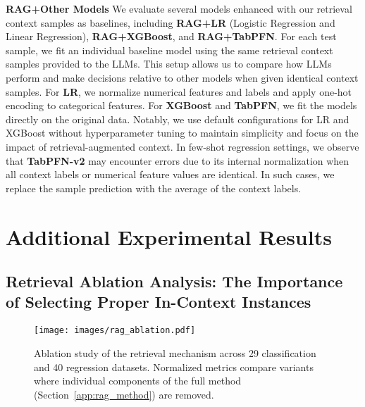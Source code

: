 \textbf{RAG+Other Models}
We evaluate several models enhanced with our retrieval context samples as baselines, including \textbf{RAG+LR} (Logistic Regression and Linear Regression), \textbf{RAG+XGBoost}, and \textbf{RAG+TabPFN}. For each test sample, we fit an individual baseline model using the same retrieval context samples provided to the LLMs. This setup allows us to compare how LLMs perform and make decisions relative to other models when given identical context samples. For \textbf{LR}, we normalize numerical features and labels and apply one-hot encoding to categorical features. For \textbf{XGBoost} and \textbf{TabPFN}, we fit the models directly on the original data. Notably, we use default configurations for LR and XGBoost without hyperparameter tuning to maintain simplicity and focus on the impact of retrieval-augmented context.
In few-shot regression settings, we observe that \textbf{TabPFN-v2} may encounter errors due to its internal normalization when all context labels or numerical feature values are identical. In such cases, we replace the sample prediction with the average of the context labels.

\section{Additional Experimental Results}
\label{app:exp}

\subsection{Retrieval Ablation Analysis: The Importance of Selecting Proper In-Context Instances}
\label{app:exp_rag_abla_test}

\begin{figure}[t]
    \centering
    \texttt{[image: images/rag\_ablation.pdf]}
    \caption{Ablation study of the retrieval mechanism across 29 classification and 40 regression datasets. Normalized metrics compare variants where individual components of the full method (Section~\ref{app:rag_method}) are removed.}
    \label{fig:rag_ablation}
\end{figure}

